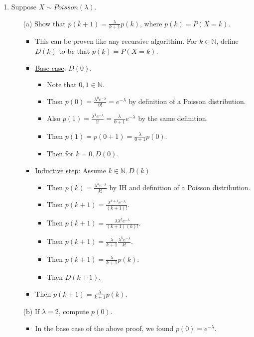 \documentclass{article}
\begin{document}
\begin{enumerate}
\item Suppose $X\sim Poisson (\lambda)$.
    \begin{itemize}
    \item [(a)] Show that $p(k+1)=\frac{\lambda}{k+1}p(k)$, where $p(k)=P(X=k)$.
        \begin{itemize}
        \item This can be proven like any recursive algorithim. For $k \in \mathbb{N}$, define $D(k)$ to be that $p(k)=P(X=k)$.
        \item \underline{Base case}: $D(0)$.
            \begin{itemize}
            \item Note that $0, 1 \in \mathbb{N}$.
            \item Then $p(0) = \frac{\lambda^0 e^{-\lambda}}{0!} = e^{-\lambda}$ by definition of a Poisson distribution.
            \item Also $p(1) = \frac{\lambda^1 e^{-\lambda}}{1!} = \frac{\lambda}{0 + 1} e^{-\lambda}$ by the same definition.
            \item Then $p(1) = p(0 + 1) = \frac{\lambda}{0+1}p(0)$.
            \item Then for $k = 0, D(0)$.
            \end{itemize}
        \item \underline{Inductive step}: Assume $k \in \mathbb{N}, D(k)$
            \begin{itemize}
            \item Then $p(k) = \frac{\lambda^k e^{-\lambda}}{k!}$ by IH and definition of a Poisson distribution.
            \item Then $p(k+1) = \frac{\lambda^{k+1} e^{-\lambda}}{(k+1)!}$.
            \item Then $p(k+1) = \frac{\lambda \lambda^k e^{-\lambda}}{(k+1)(k)!}$.
            \item Then $p(k+1) = \frac{\lambda}{k+1} \frac{\lambda^k e^{-\lambda}}{k!}$.
            \item Then $p(k+1) = \frac{\lambda}{k+1} p(k)$.
            \item Then $D(k+1)$.
            \end{itemize}
        \item Then $p(k+1)=\frac{\lambda}{k+1}p(k)$.
        \end{itemize}
    \item [(b)] If $\lambda=2$, compute $p(0)$.
        \begin{itemize}
        \item In the base case of the above proof, we found $p(0) = e^{-\lambda}$.

\end{itemize}
\end{itemize}
\end{enumerate}
\end{document}
